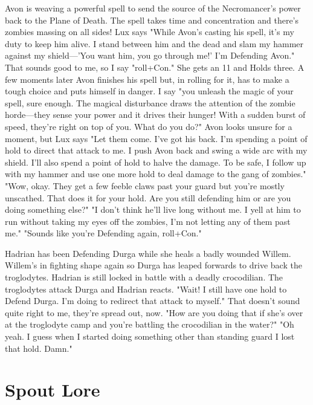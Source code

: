  
\startExample
Avon is weaving a powerful spell to send the source of the Necromancer's power back to the Plane of Death. The spell takes time and concentration and there's zombies massing on all sides! Lux says "While Avon's casting his spell, it's my duty to keep him alive. I stand between him and the dead and slam my hammer against my shield—'You want him, you go through me!' I'm Defending Avon." That sounds good to me, so I say "roll+Con." She gets an 11 and Holds three. A few moments later Avon finishes his spell but, in rolling for it, has to make a tough choice and puts himself in danger. I say "you unleash the magic of your spell, sure enough. The magical disturbance draws the attention of the zombie horde—they sense your power and it drives their hunger! With a sudden burst of speed, they're right on top of you. What do you do?" Avon looks unsure for a moment, but Lux says "Let them come. I've got his back. I'm spending a point of hold to direct that attack to me. I push Avon back and swing a wide arc with my shield. I'll also spend a point of hold to halve the damage. To be safe, I follow up with my hammer and use one more hold to deal damage to the gang of zombies." "Wow, okay. They get a few feeble claws past your guard but you're mostly unscathed. That does it for your hold. Are you still defending him or are you doing something else?" "I don't think he'll live long without me. I yell at him to run without taking my eyes off the zombies, I'm not letting any of them past me." "Sounds like you're Defending again, roll+Con."
\stopExample
 
\startExample
Hadrian has been Defending Durga while she heals a badly wounded Willem. Willem's in fighting shape again so Durga has leaped forwards to drive back the troglodytes. Hadrian is still locked in battle with a deadly crocodilian. The troglodytes attack Durga and Hadrian reacts. "Wait! I still have one hold to Defend Durga. I'm doing to redirect that attack to myself." That doesn't sound quite right to me, they're spread out, now. "How are you doing that if she's over at the troglodyte camp and you're battling the crocodilian in the water?" "Oh yeah. I guess when I started doing something other than standing guard I lost that hold. Damn."
\stopExample
 
\section{Spout Lore}    
 

